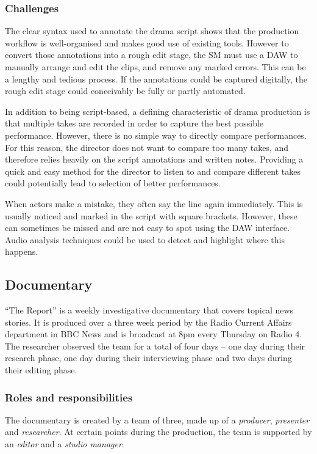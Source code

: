 \subsubsection{Challenges}
The clear syntax used to annotate the drama script shows that the production workflow is well-organised and makes good
use of existing tools. However to convert those annotations into a rough edit stage, the SM must use a DAW to manually
arrange and edit the clips, and remove any marked errors. This can be a lengthy and tedious process. If the annotations
could be captured digitally, the rough edit stage could conceivably be fully or partly automated.

In addition to being script-based, a defining characteristic of drama production is that multiple takes are recorded in
order to capture the best possible performance. However, there is no simple way to directly compare performances. For
this reason, the director does not want to compare too many takes, and therefore relies heavily on the script
annotations and written notes. Providing a quick and easy method for the director to listen to and compare different
takes could potentially lead to selection of better performances.

When actors make a mistake, they often say the line again immediately. This is usually noticed and marked in the script
with square brackets. However, these can sometimes be missed and are not easy to spot using the DAW interface. 
Audio analysis techniques could be used to detect and highlight where this happens.


\subsection{Documentary}\label{sec:doc}
``The Report'' is a weekly investigative documentary that covers topical news stories. It is produced over a three week
period by the Radio Current Affairs department in BBC News and is broadcast at 8pm every Thursday on Radio 4. The
researcher observed the team for a total of four days -- one day during their research phase, one day during their
interviewing phase and two days during their editing phase.

\subsubsection{Roles and responsibilities}
The documentary is created by a team of three, made up of a \textit{producer}, \textit{presenter} and
\textit{researcher}.  At certain points during the production, the team is supported by an \textit{editor} and
a \textit{studio manager}.

